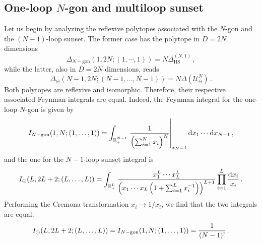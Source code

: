 \documentclass[12pt,a4paper]{article}
\theoremstyle{plain}
\theoremstyle{remark}
\newcommand{\nprops}{N}
\newcommand{\dd}{\mathrm{d}}
\newcommand{\cU}{\mathscr {U}}
\newcommand{\Newton}{\Delta}
\newcommand{\simplexwithpars}[1]{\Newton_{\text{HS}}^{(#1)}}
\begin{document}
\subsection{One-loop $\nprops$-gon and multiloop sunset}\label{sec:Family1}
Let us begin by analyzing the reflexive polytopes associated with the $\nprops$-gon and the $(\nprops-1)$-loop sunset.   The former case has the polytope in $D=2\nprops$ dimensions 
\begin{equation}
    \Delta_{\nprops-\mathrm{gon}}(1,2\nprops;(1,\cdots,1))=\nprops \simplexwithpars{\nprops,1}\, , 
\end{equation}
while the latter, also in  $D=2\nprops$ dimensions, reads
\begin{equation}
    \Delta_{\circleddash}(\nprops-1,2\nprops;(\nprops-1,\dots,\nprops-1))=\nprops\Delta(\cU_{\circleddash}^\nprops) \, .
\end{equation}
Both polytopes are reflexive and isomorphic. Therefore, their respective associated Feynman integrals are equal. Indeed, the Feynman integral for the one-loop $\nprops$-gon is given by 
	\begin{equation}\label{e:evalUngon}
			 I_{\nprops-\rm gon}(1,\nprops;(1,\dots,1))= \int_{\mathbb R^{\nprops-1}_+}
		\left.	{1\over \left(\sum_{i=1}^\nprops x_i\right)^{\nprops} }\right|_{x_\nprops=1}\dd x_1\cdots \dd x_{\nprops-1} \,,
                      \end{equation}
and the one for the  $\nprops-1$-loop sunset integral is
\begin{equation}
 I_{\circleddash}(L,2L+2; (L,\dots,L))=   \int_{\mathbb R_+^L} { x_1^L\cdots x_{L}^L  \over
  \left(x_1\cdots x_{L}\left(1+\sum_{i=1}^Lx_i^{-1}\right)\right)^{L+1}} \prod_{i=1}^L {\dd x_i\over x_i}\,.
\end{equation}
Performing the Cremona transformation $x_i\to 1/x_i$, we find that the two integrals are equal:
\begin{equation}
 I_{\circleddash}(L,2L+2;(L,\dots,L))=  I_{\nprops-\rm gon}(1,\nprops;(1,\dots,1)) ={1\over (\nprops-1)!}\,.
\end{equation}
\end{document}
